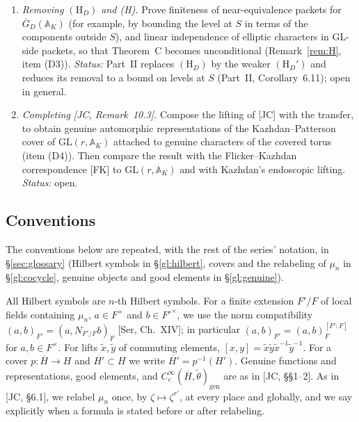 \documentclass[12pt]{article}
\newcommand{\ov}[1]{\overline{#1}}
\newcommand{\A}{\mathbb{A}}
\newcommand{\gen}{\mathrm{gen}}
\newcommand{\GL}{\mathrm{GL}}
\newcommand{\GDb}{\ov{G}_D}
\theoremstyle{plain}
\theoremstyle{definition}
\begin{document}
\begin{enumerate}[label=(\roman*)]
\item \emph{Removing $(\mathrm H_D)$ and (H).} Prove finiteness of near-equivalence packets for $\GDb(\A_K)$ (for example, by bounding the level at $S$ in terms of the components outside $S$), and linear independence of elliptic characters in $\GL$-side packets, so that Theorem~C becomes unconditional (Remark~\ref{rem:H}, item (D3)). \emph{Status:} Part~II replaces $(\mathrm H_D)$ by the weaker $(\mathrm H_D')$ and reduces its removal to a bound on levels at $S$ (Part~II, Corollary~6.11); open in general.
\item \emph{Completing [JC, Remark~10.3].} Compose the lifting of [JC] with the transfer, to obtain genuine automorphic representations of the Kazhdan--Patterson cover of $\GL(r,\A_K)$ attached to genuine characters of the covered torus (item (D4)). Then compare the result with the Flicker--Kazhdan correspondence [FK] to $\GL(r,\A_K)$ and with Kazhdan's endoscopic lifting. \emph{Status:} open.
\end{enumerate}

\subsection{Conventions}
The conventions below are repeated, with the rest of the series' notation, in \S\ref{sec:glossary} (Hilbert symbols in \S\ref{gl:hilbert}, covers and the relabeling of $\mu_n$ in \S\ref{gl:cocycle}, genuine objects and good elements in \S\ref{gl:genuine}).

All Hilbert symbols are $n$-th Hilbert symbols. For a finite extension $F'/F$ of local fields containing $\mu_n$, $a\in F^\times$ and $b\in F'^\times$, we use the norm compatibility $(a,b)_{F'}=(a,N_{F'/F}b)_F$ [Ser, Ch.~XIV]; in particular $(a,b)_{F'}=(a,b)_F^{[F':F]}$ for $a,b\in F^\times$. For lifts $\tilde x,\tilde y$ of commuting elements, $[x,y]=\tilde x\tilde y\tilde x^{-1}\tilde y^{-1}$. For a cover $p:\ov H\to H$ and $H'\subset H$ we write $\ov{H'}=p^{-1}(H')$. Genuine functions and representations, good elements, and $C_c^\infty(\ov H,\tilde\theta)_\gen$ are as in [JC, \S\S1--2]. As in [JC, \S6.1], we relabel $\mu_n$ once, by $\zeta\mapsto\zeta^{r'}$, at every place and globally, and we say explicitly when a formula is stated before or after relabeling.
\end{document}
